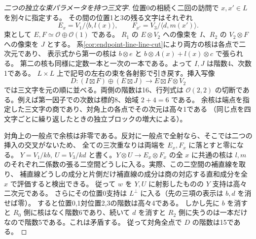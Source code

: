 \begin{proof}[二つの独立な束パラメータを持つ三文字]
位置0の相続く二回の訪問で $x,x'\in L$ を別々に指定する。
その間の位置1と3の残る文字はそれぞれ
\[
 E_x=V_1/\langle b,l(x)\rangle,\qquad F_{x'}=V_3/\langle d,m(x')\rangle .
\]
束として $E,F\simeq\mathcal O\oplus\mathcal O(1)$ である。
$R_1$ の $E\otimes V_2$ への像束を $I$、$R_2$ の $V_2\otimes F$ への像束を $J$ とする。
系\ref{cor:endpoint-line-line-cut}により両方の核は各点で二次元であり、
表示式から第一の核は $b\otimes e$ と $b\otimes A(x)+l(x)\otimes c$ で張られる。
第二の核も同様に定数一本と一次の一本である。よって $I,J$ は階数4、次数1である。
$L\times L$ 上で記号の左右の束を各射影で引き戻す。挿入写像
\[
 D:(I\boxtimes F)\oplus(E\boxtimes J)
 \longrightarrow E\boxtimes F\otimes V_2
\]
では三文字を元の順に並べる。両側の階数は16、行列式は
$\mathcal O(2,2)$ の切断である。例えば第一因子での次数は標的8、始域 $2+4=6$ である。
余核は端点を指定した三文字の商であり、対角上の各点でその次元は高々1である
（同じ点を四文字ごとに繰り返したときの独立ブロックの増大による）。

対角上の一般点で余核は非零である。反対に一般点で全射なら、そこでは二つの挿入の交叉がないため、
全ての三次重なりは両端を $E_x,F_x$ に落とすと零になる。
$Y=V_1/kb,\ U=V_3/kd$ と書く。$Y\otimes U\to E_x\otimes F_x$ の全 $x$ に共通の核は
$l,m$ のそれぞれ二係数の張る二空間どうしに入る。実際、この二空間の補直線を取り、
補直線どうしの成分と片側だけ補直線の成分は商の対応する直和成分を全 $x$ で評価すると検出できる。
従って $w$ を $Y,U$ に射影したものの $Y$ 支持は高々二次元である。
さらにその位置0支持は $L^\perp$ に入る（先の三項の表示は $b,d$ を消せば零）。
すると位置0,1対位置2,3の階数は高々4である。
しかし先に $b$ を消すと $R_0$ 側に核はなく階数6であり、続いて $d$ を消すと
$R_2$ 側に失うのは一本だけなので階数5である。これは矛盾する。
従って対角全点で $D$ の階数は15である。
\end{proof}

